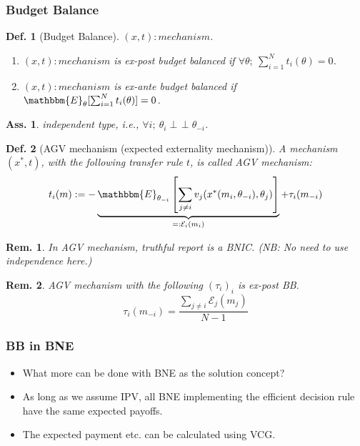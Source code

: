 \documentclass[11pt,a4paper,dvipdfmx]{article}
\theoremstyle{plain}
\newtheorem{df}{Def.}[section]
\newtheorem{rem}{Rem.}[section]
\newtheorem{ass}{Ass.}
\newcommand{\mE}{\mathcal{E}}
\newcommand{\E}{\mathbbm{E}}
\newcommand{\1}{\mathbbm{1}}
\newcommand{\indep}{\mathop{\perp\!\!\!\!\perp}}
\begin{document}
\subsubsection{Budget Balance}
\begin{df}[Budget Balance] $(x,t): mechanism$.
	\begin{enumerate}
		\item $(x,t): mechanism$ is ex-post budget balanced if $\forall \theta; \ \sum_{i=1}^N t_i(\theta) = 0$.
		\item $(x,t): mechanism$ is ex-ante budget balanced if $\E_\theta [ \sum_{i=1}^N t_i(\theta)] = 0$.
	\end{enumerate}
\end{df}
\begin{ass}
	independent type, i.e., $\forall i; \ \theta_i \indep \theta_{-i}$.
\end{ass}
\begin{df}[AGV mechanism (expected externality mechanism)] A mechanism $(x^*, t)$, with the following transfer rule $t$, is called AGV mechanism:
	\[
	t_i(m) := - \underbrace{
	\E_{\theta_{-i}} \left[
	\sum_{j \neq i} v_j(x^*(m_i, \theta_{-i}), \theta_j)
	\right]
	}_{=: \mE_i(m_i)}
	+ \tau_i(m_{-i})
	\]
\end{df}
\begin{rem}
	In AGV mechanism, truthful report is a BNIC. (NB: No need to use independence here.)
\end{rem}
\begin{rem} AGV mechanism with the following $(\tau_i)_i$ is ex-post BB.
\[
\tau_i(m_{-i}) = \frac{\sum_{j \neq i} \mE_j(m_j)}{N-1}
\]
\end{rem}



\subsubsection{BB in BNE}
\begin{itemize}
	\item What more can be done with BNE as the solution concept?
	\item As long as we assume IPV, all BNE implementing the efficient decision rule have the same expected payoffs.
	\item The expected payment etc. can be calculated using VCG.
\end{itemize}
\end{document}
